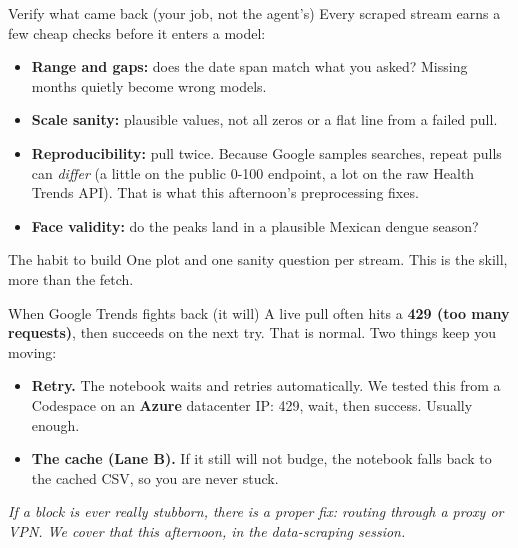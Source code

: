 \documentclass[aspectratio=169,11pt]{beamer}
\begin{document}
\begin{frame}{Verify what came back (your job, not the agent's)}
  Every scraped stream earns a few cheap checks before it enters a model:
  \begin{itemize}
    \item \textbf{Range and gaps:} does the date span match what you asked? Missing
          months quietly become wrong models.
    \item \textbf{Scale sanity:} plausible values, not all zeros or a flat line from a
          failed pull.
    \item \textbf{Reproducibility:} pull twice. Because Google samples searches, repeat
          pulls can \emph{differ} (a little on the public 0-100 endpoint, a lot on the raw
          Health Trends API). That is what this afternoon's preprocessing fixes.
    \item \textbf{Face validity:} do the peaks land in a plausible Mexican dengue season?
  \end{itemize}
  \vspace{0.3em}
  \begin{alertblock}{The habit to build}
    One plot and one sanity question per stream. This is the skill, more than the fetch.
  \end{alertblock}
\end{frame}

\begin{frame}{When Google Trends fights back (it will)}
  A live pull often hits a \textbf{429 (too many requests)}, then succeeds on the next
  try. That is normal. Two things keep you moving:
  \begin{itemize}
    \item \textbf{Retry.} The notebook waits and retries automatically. We tested this from
          a Codespace on an \textbf{Azure} datacenter IP: 429, wait, then success. Usually
          enough.
    \item \textbf{The cache (Lane B).} If it still will not budge, the notebook falls back
          to the cached CSV, so you are never stuck.
  \end{itemize}
  \vspace{0.3em}
  \begin{center}
    \itshape If a block is ever really stubborn, there is a proper fix: routing through a
    proxy or VPN. We cover that this afternoon, in the data-scraping session.
  \end{center}
\end{frame}
\end{document}
